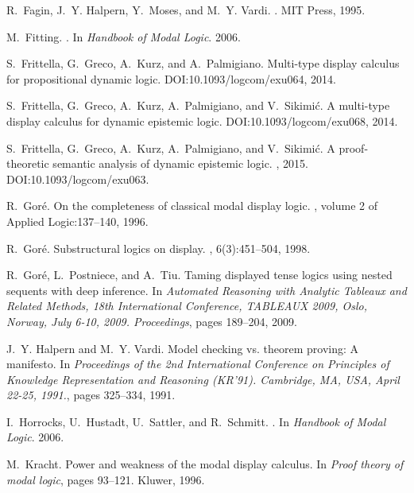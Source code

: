 \documentclass[runningheads,a4paper]{llncs}
\begin{document}
\begin{thebibliography}{10}
R.~Fagin, J.~Y. Halpern, Y.~Moses, and M.~Y. Vardi.
.
\newblock MIT Press, 1995.

M.~Fitting.
.
\newblock In {\em Handbook of Modal Logic}. 2006.

S.~Frittella, G.~Greco, A.~Kurz, and A.~Palmigiano.
\newblock Multi-type display calculus for propositional dynamic logic.
\newblock DOI:10.1093/logcom/exu064, 2014.

S.~Frittella, G.~Greco, A.~Kurz, A.~Palmigiano, and V.~Sikimi\'{c}.
\newblock A multi-type display calculus for dynamic epistemic logic.
\newblock DOI:10.1093/logcom/exu068, 2014.

S.~Frittella, G.~Greco, A.~Kurz, A.~Palmigiano, and V.~Sikimi\'{c}.
\newblock A proof-theoretic semantic analysis of dynamic epistemic logic.
, 2015.
\newblock DOI:10.1093/logcom/exu063.

R.~Gor{\'e}.
\newblock On the completeness of classical modal display logic.
, volume 2 of
  Applied Logic:137--140, 1996.

R.~Gor\'e.
\newblock Substructural logics on display.
, 6(3):451--504, 1998.

R.~Gor{\'{e}}, L.~Postniece, and A.~Tiu.
\newblock Taming displayed tense logics using nested sequents with deep
  inference.
\newblock In {\em Automated Reasoning with Analytic Tableaux and Related
  Methods, 18th International Conference, {TABLEAUX} 2009, Oslo, Norway, July
  6-10, 2009. Proceedings}, pages 189--204, 2009.

J.~Y. Halpern and M.~Y. Vardi.
\newblock Model checking vs. theorem proving: {A} manifesto.
\newblock In {\em Proceedings of the 2nd International Conference on Principles
  of Knowledge Representation and Reasoning (KR'91). Cambridge, MA, USA, April
  22-25, 1991.}, pages 325--334, 1991.

I.~Horrocks, U.~Hustadt, U.~Sattler, and R.~Schmitt.
.
\newblock In {\em Handbook of Modal Logic}. 2006.

M.~Kracht.
\newblock Power and weakness of the modal display calculus.
\newblock In {\em Proof theory of modal logic}, pages 93--121. Kluwer, 1996.


\end{thebibliography}
\end{document}
